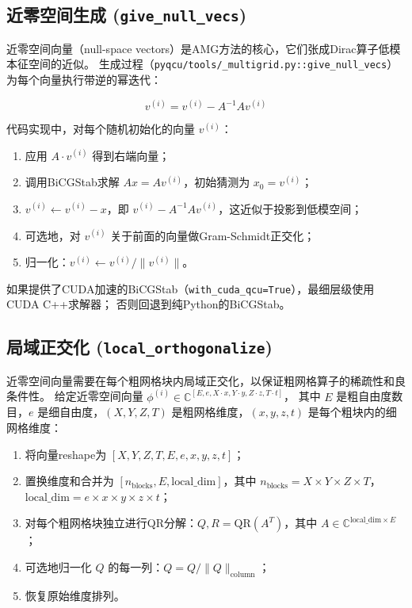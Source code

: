 \documentclass[11pt,a4paper]{article}
\begin{document}
\subsection{近零空间生成 (\texttt{give\_null\_vecs})}

近零空间向量（null-space vectors）是AMG方法的核心，它们张成Dirac算子低模本征空间的近似。
生成过程（\texttt{pyqcu/tools/\_multigrid.py::give\_null\_vecs}）为每个向量执行带逆的幂迭代：

\begin{equation}
v^{(i)} = v^{(i)} - A^{-1} A v^{(i)}
\end{equation}

代码实现中，对每个随机初始化的向量 $v^{(i)}$：
\begin{enumerate}
    \item 应用 $A \cdot v^{(i)}$ 得到右端向量；
    \item 调用BiCGStab求解 $A x = A v^{(i)}$，初始猜测为 $x_0 = v^{(i)}$；
    \item $v^{(i)} \gets v^{(i)} - x$，即 $v^{(i)} - A^{-1}Av^{(i)}$，这近似于投影到低模空间；
    \item 可选地，对 $v^{(i)}$ 关于前面的向量做Gram-Schmidt正交化；
    \item 归一化：$v^{(i)} \gets v^{(i)} / \|v^{(i)}\|$。
\end{enumerate}

如果提供了CUDA加速的BiCGStab（\texttt{with\_cuda\_qcu=True}），最细层级使用CUDA C++求解器；
否则回退到纯Python的BiCGStab。

\subsection{局域正交化 (\texttt{local\_orthogonalize})}

近零空间向量需要在每个粗网格块内局域正交化，以保证粗网格算子的稀疏性和良条件性。
给定近零空间向量 $\phi^{(i)} \in \mathbb{C}^{[E, e, X\cdot x, Y\cdot y, Z\cdot z, T\cdot t]}$，
其中 $E$ 是粗自由度数目，$e$ 是细自由度，$(X,Y,Z,T)$ 是粗网格维度，$(x,y,z,t)$ 是每个粗块内的细网格维度：

\begin{enumerate}
    \item 将向量reshape为 $[X, Y, Z, T, E, e, x, y, z, t]$；
    \item 置换维度和合并为 $[n_{\text{blocks}}, E, \text{local\_dim}]$，其中 $n_{\text{blocks}}=X\times Y\times Z\times T$，
          $\text{local\_dim}=e\times x\times y\times z\times t$；
    \item 对每个粗网格块独立进行QR分解：$Q, R = \text{QR}(A^T)$，其中 $A\in\mathbb{C}^{\text{local\_dim}\times E}$；
    \item 可选地归一化 $Q$ 的每一列：$Q = Q / \|Q\|_{\text{column}}$；
    \item 恢复原始维度排列。
\end{enumerate}
\end{document}
